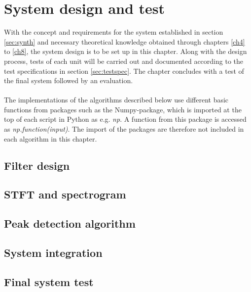 \chapter{System design and test} \label{ch10}
With the concept and requirements for the system established in section \ref{sec:synth} and necessary theoretical knowledge obtained through chapters \ref{ch4} to \ref{ch8}, the system design is to be set up in this chapter. Along with the design process, tests of each unit will be carried out and documented according to the test specifications in section \ref{sec:testspec}. The chapter concludes with a test of the final system followed by an evaluation.
\\ \\
The implementations of the algorithms described below use different basic functions from packages such as the Numpy-package, which is imported at the top of each script in Python as e.g. \textit{np}. A function from this package is accessed as \textit{np.function(input)}. The import of the packages are therefore not included in each algorithm in this chapter.



\section{Filter design}


\section{STFT and spectrogram}


\section{Peak detection algorithm}


\section{System integration}


\section{Final system test}


